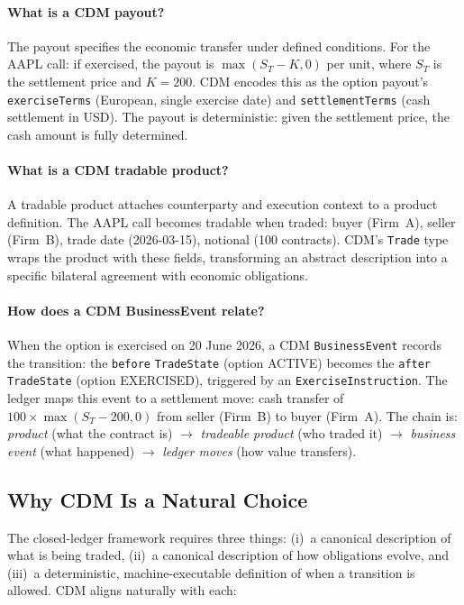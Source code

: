 \documentclass[11pt,a4paper]{article}
\begin{document}
\paragraph{What is a CDM payout?}
The payout specifies the economic transfer under defined conditions. For the AAPL call: if exercised, the payout is $\max(S_T - K, 0)$ per unit, where $S_T$ is the settlement price and $K = 200$. CDM encodes this as the option payout's \texttt{exerciseTerms} (European, single exercise date) and \texttt{settlementTerms} (cash settlement in USD). The payout is deterministic: given the settlement price, the cash amount is fully determined.

\paragraph{What is a CDM tradable product?}
A tradable product attaches counterparty and execution context to a product definition. The AAPL call becomes tradable when traded: buyer (Firm~A), seller (Firm~B), trade date (2026-03-15), notional (100 contracts). CDM's \texttt{Trade} type wraps the product with these fields, transforming an abstract description into a specific bilateral agreement with economic obligations.

\paragraph{How does a CDM BusinessEvent relate?}
When the option is exercised on 20 June 2026, a CDM \texttt{BusinessEvent} records the transition: the \texttt{before} \texttt{TradeState} (option ACTIVE) becomes the \texttt{after} \texttt{TradeState} (option EXERCISED), triggered by an \texttt{ExerciseInstruction}. The ledger maps this event to a settlement move: cash transfer of $100 \times \max(S_T - 200, 0)$ from seller (Firm~B) to buyer (Firm~A). The chain is: \emph{product} (what the contract is) $\to$ \emph{tradeable product} (who traded it) $\to$ \emph{business event} (what happened) $\to$ \emph{ledger moves} (how value transfers).

\subsection{Why CDM Is a Natural Choice}

The closed-ledger framework requires three things: (i)~a canonical description of what is being traded, (ii)~a canonical description of how obligations evolve, and (iii)~a deterministic, machine-executable definition of when a transition is allowed. CDM aligns naturally with each:
\end{document}
